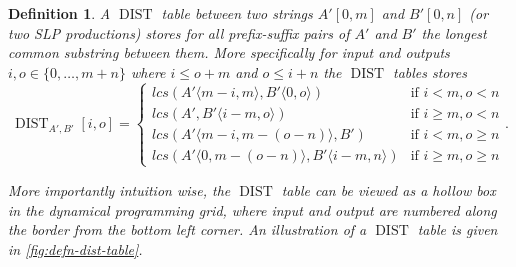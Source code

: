 \documentclass[twoside,11pt,openright]{report}
\newcommand{\DIST}{\operatorname{DIST}}
\newcommand{\substr}[3]{#1\langle #2, #3 \rangle}
\newcommand{\str}[3]{#1[#2, #3]}
\newtheorem{mydef}{Definition}
\begin{document}
\begin{mydef}
  \label{defn:dist-table}
  A $\DIST$ table between two strings $\str{A'}{0}{m}$ and $\str{B'}{0}{n}$ (or two SLP productions) stores for all prefix-suffix pairs of $A'$ and $B'$ the longest common substring between them. More specifically for input and outputs $i, o \in \{0, \dots, m + n\}$ where $i \leq o + m$ and $o \leq i + n$ the $\DIST$ tables stores
  \[
    \DIST_{A',B'}[i, o] = \left\{
    \begin{array}{ll}
      lcs(\substr{A'}{m - i}{m}, \substr{B'}{0}{o})             & \text{if } i < m, o < n \\
      lcs(A', \substr{B'}{i - m}{o})                            & \text{if } i \geq m, o < n \\
      lcs(\substr{A'}{m - i}{m - (o - n)}, B')                  & \text{if } i < m, o \geq n \\
      lcs(\substr{A'}{0}{m - (o - n)}, \substr{B'}{i - m}{n})   & \text{if } i \geq m, o \geq n
    \end{array}
  \right. .
  \]

  More importantly intuition wise, the $\DIST$ table can be viewed as a hollow box in the dynamical programming grid, where input and output are numbered along the border from the bottom left corner. An illustration of a $\DIST$ table is given in \cref{fig:defn-dist-table}.


\end{mydef}
\end{document}
